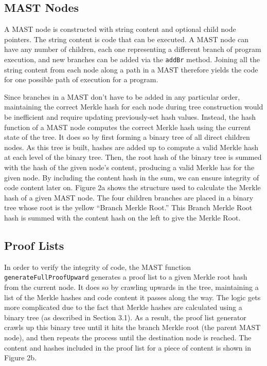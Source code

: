 \documentclass{vldb}
\begin{document}
\subsection{MAST Nodes}

A MAST node is constructed with string content and optional child node pointers. The string content is code that can be executed. A MAST node can have any number of children, each one representing a different branch of program execution, and new branches can be added via the \texttt{addBr} method. Joining all the string content from each node along a path in a MAST therefore yields the code for one possible path of execution for a program.
 
Since branches in a MAST don’t have to be added in any particular order, maintaining the correct Merkle hash for each node during tree construction would be inefficient and require updating previously-set hash values. Instead, the hash function of a MAST node computes the correct Merkle hash using the current state of the tree. It does so by first forming a binary tree of all direct children nodes. As this tree is built, hashes are added up to compute a valid Merkle hash at each level of the binary tree. Then, the root hash of the binary tree is summed with the hash of the given node's content, producing a valid Merkle has for the given node. By including the content hash in the sum, we can ensure integrity of code content later on. Figure 2a shows the structure used to calculate the Merkle hash of a given MAST node. The four children branches are placed in a binary tree whose root is the yellow ``Branch Merkle Root.'' This Branch Merkle Root hash is summed with the content hash on the left to give the Merkle Root.

\subsection{Proof Lists}

In order to verify the integrity of code, the MAST function \texttt{generateFullProofUpward} generates a proof list to a given Merkle root hash from the current node. It does so by crawling upwards in the tree, maintaining a list of the Merkle hashes and code content it passes along the way. The logic gets more complicated due to the fact that Merkle hashes are calculated using a binary tree (as described in Section 3.1). As a result, the proof list generator crawls up this binary tree until it hits the branch Merkle root (the parent MAST node), and then repeats the process until the destination node is reached. The content and hashes included in the proof list for a piece of content is shown in Figure 2b.
\end{document}

